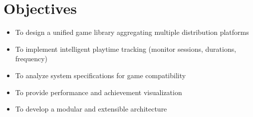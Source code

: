 \section{Objectives}
\begin{itemize}
  \item To design a unified game library aggregating multiple distribution platforms
  \item To implement intelligent playtime tracking (monitor sessions, durations, frequency)
  \item To analyze system specifications for game compatibility
  \item To provide performance and achievement visualization
  \item To develop a modular and extensible architecture
\end{itemize}
